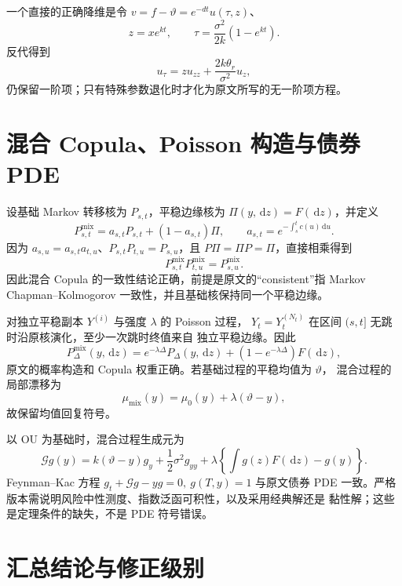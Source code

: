 \documentclass[UTF8,11pt]{ctexart}
\newcommand{\dd}{\,\mathrm d}
\begin{document}
一个直接的正确降维是令 $v=f-\vartheta=e^{-dt}u(\tau,z)$、
\[
 z=xe^{kt},\qquad
 \tau=\frac{\sigma^2}{2k}(1-e^{kt}).
\]
反代得到
\[
 u_\tau=zu_{zz}+\frac{2k\theta_r}{\sigma^2}u_z,
\]
仍保留一阶项；只有特殊参数退化时才化为原文所写的无一阶项方程。

\section{混合 Copula、Poisson 构造与债券 PDE}

设基础 Markov 转移核为 $P_{s,t}$，平稳边缘核为
$\Pi(y,\dd z)=F(\dd z)$，并定义
\[
 P^{\mathrm{mix}}_{s,t}=a_{s,t}P_{s,t}+(1-a_{s,t})\Pi,\qquad
 a_{s,t}=e^{-\int_s^tc(u)\dd u}.
\]
因为 $a_{s,u}=a_{s,t}a_{t,u}$、$P_{s,t}P_{t,u}=P_{s,u}$，且
$P\Pi=\Pi P=\Pi$，直接相乘得到
\[
 P^{\mathrm{mix}}_{s,t}P^{\mathrm{mix}}_{t,u}
 =P^{\mathrm{mix}}_{s,u}.
\]
因此混合 Copula 的一致性结论正确，前提是原文的“consistent”指
Markov Chapman--Kolmogorov 一致性，并且基础核保持同一个平稳边缘。

对独立平稳副本 $Y^{(i)}$ 与强度 $\lambda$ 的 Poisson 过程，
$Y_t=Y_t^{(N_t)}$ 在区间 $(s,t]$ 无跳时沿原核演化，至少一次跳时终值来自
独立平稳边缘。因此
\[
 P^{\mathrm{mix}}_\Delta(y,\dd z)
 =e^{-\lambda\Delta}P_\Delta(y,\dd z)
 +(1-e^{-\lambda\Delta})F(\dd z),
\]
原文的概率构造和 Copula 权重正确。若基础过程的平稳均值为 $\vartheta$，
混合过程的局部漂移为
\[
 \mu_{\mathrm{mix}}(y)=\mu_0(y)+\lambda(\vartheta-y),
\]
故保留均值回复符号。

以 OU 为基础时，混合过程生成元为
\[
 \mathcal Gg(y)=k(\vartheta-y)g_y+\frac12\sigma^2g_{yy}
 +\lambda\left\{\int g(z)F(\dd z)-g(y)\right\}.
\]
Feynman--Kac 方程 $g_t+\mathcal Gg-yg=0,\ g(T,y)=1$ 与原文债券 PDE
一致。严格版本需说明风险中性测度、指数泛函可积性，以及采用经典解还是
黏性解；这些是定理条件的缺失，不是 PDE 符号错误。

\section{汇总结论与修正级别}
\end{document}
